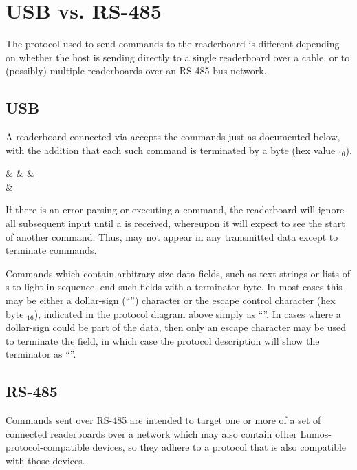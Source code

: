 \section{USB vs. RS-485}
The protocol used to send commands to the readerboard is different depending on
whether the host is sending directly to a single readerboard over a 
cable, or to (possibly) multiple readerboards over an RS-485 bus network.

\subsection{USB}
A readerboard connected via  accepts the commands just as documented
below, with the addition that each such command is terminated by a 
 byte (hex value $_{16}$).
\begin{center}
\begin{bytefield}[endianness=little,bitwidth=0.11111\textwidth]{9}
	&
	&
	&
	\\
	&
\end{bytefield}
\end{center}

If there is an error parsing or executing a command, the readerboard will ignore
all subsequent input until a  is received, whereupon it will
expect to see the start of another command. Thus,  may not
appear in any transmitted data except to terminate commands.

Commands which contain arbitrary-size data fields, such as text strings or lists of
s to light in sequence, end such fields with a terminator byte. In most cases
this may be
either a dollar-sign (``\z{\$}'') character or the
escape control character (hex byte $_{16}$), indicated in the protocol diagram above
simply as ``\z{\$}''. In cases where a dollar-sign could be part of the data, then
only an escape character may be used to terminate the field, in which case the protocol
description will show the terminator as ``''.
\subsection{RS-485}
Commands sent over RS-485 are intended to target one or more of a set of
connected readerboards over a network which may also contain other Lumos-protocol-compatible
devices, so they adhere to a protocol that is also compatible with those devices.

